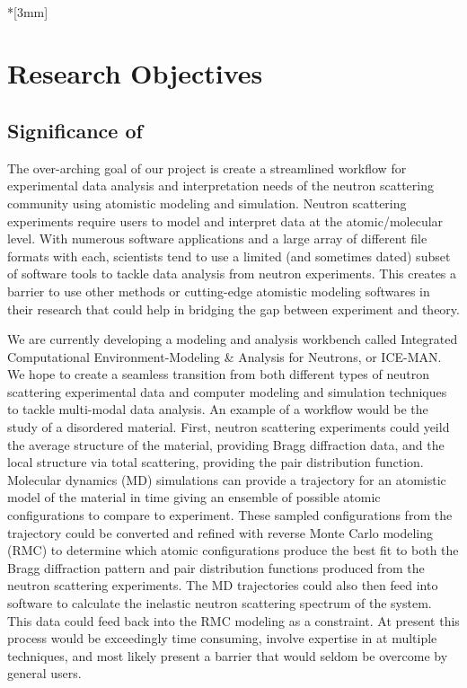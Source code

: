 \documentclass{proposalnsf}
\begin{document}
\\*[3mm]

\renewcommand{\thepage} {\arabic{page}}



\section*{Research Objectives}

\subsection*{Significance of  }

The over-arching goal of our project is create a streamlined workflow
for experimental data analysis and interpretation
needs of the neutron scattering community using atomistic modeling and
simulation. Neutron scattering experiments require users to model and
interpret data at the atomic/molecular level. With numerous software
applications and a large array of different file formats with each,
scientists tend to use a limited (and sometimes dated) subset of
software tools to tackle data analysis from neutron experiments. This
creates a barrier to use other methods or cutting-edge atomistic
modeling softwares in their research that could help in bridging the gap
between experiment and theory. 

We are currently developing a modeling and analysis workbench called
Integrated Computational Environment-Modeling \& Analysis for Neutrons,
or ICE-MAN. We hope to create a seamless transition from both different
types of neutron scattering experimental data and computer modeling and
simulation techniques to tackle multi-modal data
analysis. An example of a workflow would be the study of a disordered
material. First, neutron scattering experiments could yeild the average
structure of the material, providing Bragg diffraction data, and
the local structure via total scattering, providing the pair
distribution function.  Molecular dynamics (MD) simulations can provide
a trajectory for an atomistic model of the material in time giving an
ensemble of possible atomic configurations to compare to experiment.
These sampled
configurations from the trajectory could be converted and refined with
reverse Monte Carlo modeling (RMC) to determine which atomic configurations
produce the best fit to both the Bragg diffraction pattern and pair
distribution functions produced from the neutron scattering experiments.
The MD trajectories could also then feed into software to calculate the
inelastic neutron scattering spectrum of the system. This data could
feed back into the RMC modeling as a constraint. At present this process
would be exceedingly time consuming, involve expertise in at multiple
techniques, and most likely present a barrier that would
seldom be overcome by general users. 
\end{document}
